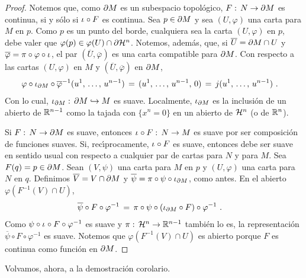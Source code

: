 \begin{proof}
	Notemos que, como $\borde[M]$ es un subespacio topol\'{o}gico,
	$F:\,N\rightarrow\borde[M]$ es continua, si y s\'{o}lo si
	$\inc\circ F$ es continua. Sea $p\in\borde[M]$ y sea $(U,\varphi)$
	una carta para $M$ en $p$. Como $p$ es un punto del borde, cualquiera
	sea la carta $(U,\varphi)$ en $p$, debe valer que
	$\varphi(p)\in\varphi(U)\cap\borde[{\hemi[n]}]$. Notemos, adem\'{a}s,
	que, si $\overline{U}=\borde[M]\cap U$ y
	$\overline{\varphi}=\pi\circ\varphi\circ\inc$, el par
	$(\overline{U},\overline{\varphi})$ es una carta compatible para
	$\borde[M]$. Con respecto a las cartas $(U,\varphi)$ en $M$ y
	$(\overline{U},\overline{\varphi})$ en $\borde[M]$,
	\begin{align*}
		\varphi\circ\inc[{\borde[M]}]\circ\overline{\varphi}^{-1}
			(\lista*{u}{n-1}) & \,=\,(\lista*{u}{n-1},\,0)
			\,=\,j(\lista*{u}{n-1})
		\text{ .}
	\end{align*}
	Con lo cual, $\inc[{\borde[M]}]:\,\borde[M]\hookrightarrow M$ es
	suave. Localmente, $\inc[{\borde[M]}]$ es la inclusi\'{o}n de un
	abierto de $\bb{R}^{n-1}$ como la tajada con $\{x^{n}=0\}$ en
	un abierto de $\hemi[n]$ (o de $\bb{R}^{n}$).

	Si $F:\,N\rightarrow\borde[M]$ es suave, entonces
	$\inc\circ F:\,N\rightarrow M$ es suave por ser composici\'{o}n
	de funciones suaves. Si, rec\'{\i}procamente, $\inc\circ F$ es suave,
	entonces debe ser suave en sentido usual con respecto a cualquier
	par de cartas para $N$ y para $M$. Sea $F(q)=p\in\borde[M]$. Sean
	$(V,\psi)$ una carta para $M$ en $p$ y $(U,\varphi)$ una carta
	para $N$ en $q$. Definimos $\overline{V}=V\cap\borde[M]$ y
	$\overline{\psi}=\pi\circ\psi\circ\inc[{\borde[M]}]$, como antes.
	En el abierto $\varphi(F^{-1}(V)\cap U)$,
	\begin{align*}
		\overline{\psi}\circ F\circ\varphi^{-1} & \,=\,
			\pi\circ\psi\circ(\inc[{\borde[M]}]\circ F)\circ
			\varphi^{-1}
		\text{ .}
	\end{align*}
	Como $\psi\circ\inc\circ F\circ\varphi^{-1}$ es suave y
	$\pi:\,\hemi[n]\rightarrow\bb{R}^{n-1}$ tambi\'{e}n lo es, la
	representaci\'{o}n $\overline{\psi}\circ F\circ\varphi^{-1}$ es
	suave. Notemos que $\varphi(F^{-1}(V)\cap U)$ es abierto
	porque $F$ es continua como funci\'{o}n en $\borde[M]$.
\end{proof}

Volvamos, ahora, a la demostraci\'{o}n corolario.

